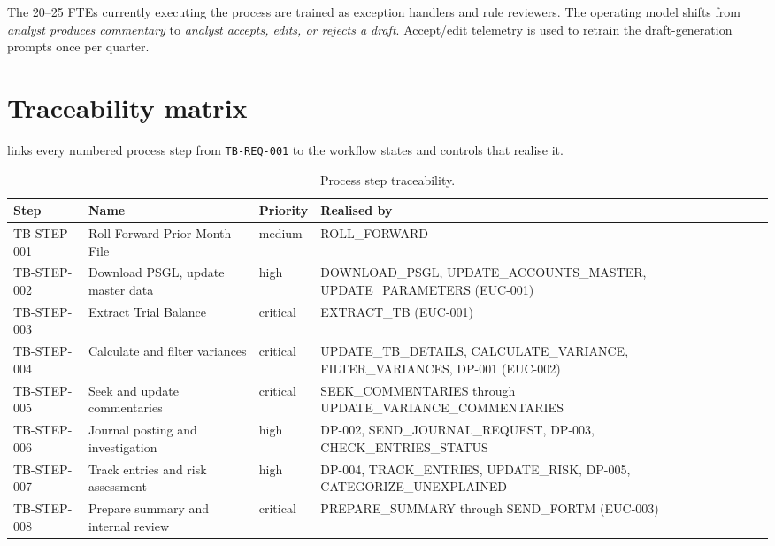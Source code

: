 The 20--25 FTEs currently executing the process are trained as
exception handlers and rule reviewers. The operating model shifts
from \emph{analyst produces commentary} to \emph{analyst accepts,
edits, or rejects a draft}. Accept/edit telemetry is used to retrain
the draft-generation prompts once per quarter.

\section{Traceability matrix}

 links every numbered process step from
\texttt{TB-REQ-001} to the workflow states and controls that realise
it.

\begin{table}[htbp]
\caption{Process step traceability.}\label{tab:traceability}
\centering
\footnotesize
\begin{tabularx}{\linewidth}{@{}p{2.1cm}p{3.9cm}lX@{}}
\toprule
\textbf{Step} & \textbf{Name} & \textbf{Priority} & \textbf{Realised by} \\ \midrule
TB-STEP-001 & Roll Forward Prior Month File        & medium   & ROLL\_FORWARD \\
TB-STEP-002 & Download PSGL, update master data    & high     & DOWNLOAD\_PSGL, UPDATE\_ACCOUNTS\_MASTER, UPDATE\_PARAMETERS (EUC-001) \\
TB-STEP-003 & Extract Trial Balance                & critical & EXTRACT\_TB (EUC-001) \\
TB-STEP-004 & Calculate and filter variances       & critical & UPDATE\_TB\_DETAILS, CALCULATE\_VARIANCE, FILTER\_VARIANCES, DP-001 (EUC-002) \\
TB-STEP-005 & Seek and update commentaries         & critical & SEEK\_COMMENTARIES through UPDATE\_VARIANCE\_COMMENTARIES \\
TB-STEP-006 & Journal posting and investigation    & high     & DP-002, SEND\_JOURNAL\_REQUEST, DP-003, CHECK\_ENTRIES\_STATUS \\
TB-STEP-007 & Track entries and risk assessment    & high     & DP-004, TRACK\_ENTRIES, UPDATE\_RISK, DP-005, CATEGORIZE\_UNEXPLAINED \\
TB-STEP-008 & Prepare summary and internal review  & critical & PREPARE\_SUMMARY through SEND\_FORTM (EUC-003) \\
\bottomrule
\end{tabularx}
\end{table}
